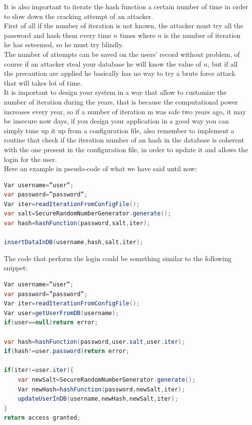 It is also important to iterate the hash function a certain number of time in order to slow down the cracking attempt of an attacker.\\
First of all if the number of iteration is not known, the attacker must try all the password and hash them every time $n$ times where $n$ is the number of iteration he has esteemed, so he must try blindly.\\
The number of attempts can be saved on the users’ record without problem, of course if an attacker steal your database he will know the value of $n$, but if all the precaution are applied he basically has no way to try a brute force attack that will takes lot of time.\\
It is important to design your system in a way that allow to customize the number of iteration during the years, that is because the computational power increases every year, so if a number of iteration m was safe two years ago, it may be insecure now days, if you design your application in a good way you can simply tune up it up from a configuration file, also remember to implement a routine that check if the iteration number of an hash in the database is coherent with the one present in the configuration file, in order to update it and allows the login for the user.\\

Here an example in pseudo-code of what we have said until now:
\begin{lstlisting}[language=Java]
Var username=”user”;
var password=”password”;
Var iter=readIterationFromConfigFile();
var salt=SecureRandomNumberGenerator.generate();
var hash=hashFunction(password,salt,iter);

insertDataInDB(username,hash,salt,iter);
\end{lstlisting}

The code that perform the login could be something similar to the following snippet:
\begin{lstlisting}[language=Java]
Var username=”user”;
var password=”password”;
Var iter=readIterationFromConfigFile();
Var user=getUserFromDB(username);
if(user==null)return error;

var hash=hashFunction(password,user.salt,user.iter);
if(hash!=user.password)return error;

if(iter!=user.iter){
	var newSalt=SecureRandomNumberGenerator.generate();
	Var newHash=hashFunction(password,newSalt,iter);
	updateUserInDB(username,newHash,newSalt,iter);
}
return access granted;
\end{lstlisting}

